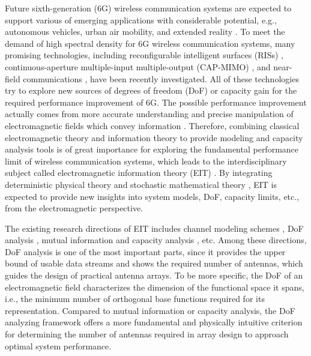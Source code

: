 \documentclass[12pt,draftclsnofoot,journal,onecolumn]{IEEEtran}
\begin{document}
Future sixth-generation (6G) wireless communication systems are expected to support various of emerging applications with considerable potential, e.g., autonomous vehicles, urban air mobility, and extended reality \cite{na2024operator}.
To meet the demand of high spectral density for 6G wireless communication systems, many promising technologies, including reconfigurable intelligent surfaces (RISs) \cite{basar2019wireless,wang2022location}, continuous-aperture multiple-input multiple-output (CAP-MIMO) \cite{huang2020holographic,zhang2023pattern}, and near-field communications \cite{cui2022near,wu2023multiple}, have been recently investigated. All of these technologies try to explore new sources of degrees of freedom (DoF) or capacity gain for the required performance improvement of 6G. The possible performance improvement actually comes from more accurate understanding and precise manipulation of electromagnetic fields which convey information \cite{chafii2023twelve}. Therefore, combining classical electromagnetic theory and information theory to provide modeling and capacity analysis tools is of great importance for exploring the fundamental performance limit of wireless communication systems, which leads to the interdisciplinary subject called electromagnetic information theory (EIT) \cite{migliore2018horse}. By integrating deterministic physical theory and stochastic mathematical theory \cite{zhu2022electromagnetic}, EIT is expected to provide new insights into system models, DoF, capacity limits, etc., from the electromagnetic perspective. 

The existing research directions of EIT includes channel modeling schemes \cite{gong2023holographic,wei2023tri,pizzo2023wide}, DoF analysis \cite{bucci1987spatial, bucci1989degrees,franceschetti2015landau}, mutual information and capacity analysis \cite{jensen2008capacity,jeon2017capacity,wan2022mutual}, etc.
Among these directions, DoF analysis is one of the most important parts, since it provides the upper bound of usable data streams and shows the required number of antennas, which guides the design of practical antenna arrays. {\color{red}To be more specific, the DoF of an electromagnetic field characterizes the dimension of the functional space it spans, i.e., the minimum number of orthogonal base functions required for its representation. Compared to mutual information or capacity analysis, the DoF analyzing framework offers a more fundamental and physically intuitive criterion for determining the number of antennas required in array design to approach optimal system performance. }
\end{document}

